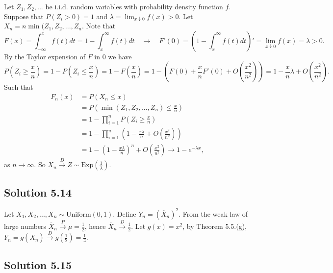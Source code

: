 Let $Z_1, Z_2, ...$ be i.i.d. random variables with probability density function $f$.
Suppose that $P(Z_i > 0) = 1$ and $\lambda = \lim_{x \downarrow 0} f(x) > 0$.
Let $X_n = n \min(Z_1, Z_2, ..., Z_n$.
Note that
\begin{equation*}
    F(x) = \int_{-\infty}^{x} f(t) dt
        = 1 - \int_{x}^{\infty} f(t) dt
        \quad \rightarrow \quad
    F'(0) = \left( 1 - \int_{x}^{\infty} f(t) dt \right)'
        = \lim_{x \downarrow 0} f(x)
        = \lambda > 0.
\end{equation*}
By the Taylor expension of $F$ in $0$ we have
\begin{equation*}
    P(Z_i \geq \frac{x}{n}) = 1 - P(Z_i \leq \frac{x}{n})
        = 1 - F(\frac{x}{n})
        = 1 - (F(0) + \frac{x}{n} F'(0) + O(\frac{x^2}{n^2}))
        = 1 - \frac{x}{n} \lambda + O(\frac{x^2}{n^2}).
\end{equation*}
Such that
\begin{equation*}
    \begin{split}
        F_n(x)
            &= P\left(X_n \leq x\right) \\
            &= P\left(\min(Z_1, Z_2, ..., Z_n) \leq \frac{x}{n}\right) \\
            &= 1 - \prod_{i = 1}^n P\left(Z_i \geq \frac{x}{n}\right) \\
            &= 1 - \prod_{i = 1}^n \left(1 - \frac{x \lambda}{n} + O(\frac{x^2}{n^2})\right) \\
            &= 1 - \left(1 - \frac{x \lambda}{n}\right)^n + O\left(\frac{x^2}{n^2}\right)
            \to 1 - e^{-\lambda x},
    \end{split}
\end{equation*}
as $n \to \infty$.
So $X_n \xrightarrow{D} Z \sim \mathrm{Exp}(\frac{1}{\lambda})$.


\subsection*{Solution 5.14}

Let $X_1, X_2, ..., X_n \sim \mathrm{Uniform}(0, 1)$.
Define $Y_n = (\overline{X}_n)^2$.
From the weak law of large numbers $\overline{X}_n \xrightarrow{P} \mu = \frac{1}{2}$, hence $\overline{X}_n \xrightarrow{D} \frac{1}{2}$.
Let $g(x) = x^2$, by Theorem 5.5.(g), $Y_n = g(\overline{X}_n) \xrightarrow{D} g(\frac{1}{2}) = \frac{1}{4}$.


\subsection*{Solution 5.15}

